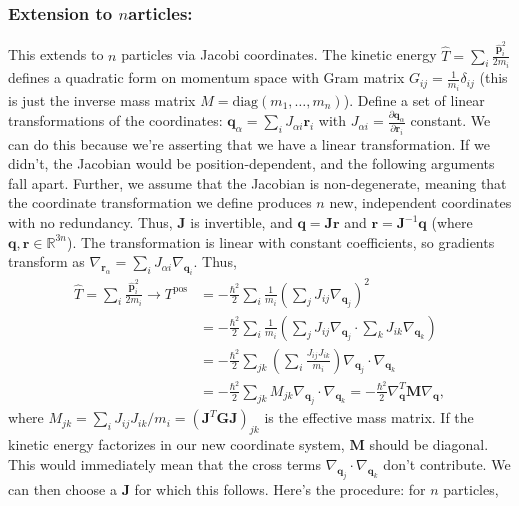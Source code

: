 \subsubsection{Extension to \texorpdfstring{$n$} particles:}
This extends to $n$ particles via Jacobi coordinates. The kinetic energy $\hat{T}=\sum_i \frac{\hat{\mathbf{p}}_i^2}{2m_i}$ defines a quadratic form on momentum space with Gram matrix $G_{ij}=\frac{1}{m_i}\delta_{ij}$ (this is just the inverse mass matrix $M=\text{diag}(m_1, \dots, m_n)$). Define a set of linear transformations of the coordinates: $\mathbf{q}_\alpha=\sum_i J_{\alpha i}\mathbf{r}_i$ with $J_{\alpha i} = \frac{\partial \mathbf{q}_\alpha}{\partial \mathbf{r}_i}$ constant. We can do this because we're asserting that we have a linear transformation. If we didn't, the Jacobian would be position-dependent, and the following arguments fall apart. Further, we assume that the Jacobian is non-degenerate, meaning that the coordinate transformation we define produces $n$ new, independent coordinates with no redundancy. Thus, $\mathbf{J}$ is invertible, and $\mathbf{q}=\mathbf{J r}$ and $\mathbf{r}=\mathbf{J}^{-1}\mathbf{q}$ (where $\mathbf{q},\mathbf{r}\in\mathbb{R}^{3n}$). The transformation is linear with constant coefficients, so gradients transform as $\nabla_{\mathbf{r}_\alpha}=\sum_i J_{\alpha i} \nabla_{\mathbf{q}_i}$. Thus,
\begin{align*}
    \hat{T}=\sum_i \frac{\hat{\mathbf{p}}_i^2}{2m_i} \rightarrow T^\text{pos}&= -\frac{\hbar^2}{2}\sum_i\frac{1}{m_i}\left(\sum_j J_{ij} \nabla_{\mathbf{q}_j}\right)^2\\
    &=-\frac{\hbar^2}{2}\sum_i \frac{1}{m_i}\left( \sum_{j} J_{ij}\nabla_{\mathbf{q}_j}\cdot\sum_k J_{ik}\nabla_{\mathbf{q}_k}\right)\\
    &= -\frac{\hbar^2}{2}\sum_{jk}\left(\sum_i \frac{J_{ij}J_{ik}}{m_i} \right)\nabla_{\mathbf{q}_j}\cdot\nabla_{\mathbf{q}_k}\\
    &= -\frac{\hbar^2}{2}\sum_{jk} M_{jk}\nabla_{\mathbf{q}_j}\cdot\nabla_{\mathbf{q}_k}= -\frac{\hbar^2}{2} \nabla_{\mathbf{q}}^T\mathbf{M}\nabla_{\mathbf{q}},
\end{align*}
where $M_{jk}=\sum_iJ_{ij}J_{ik}/m_i=(\mathbf{J}^T \mathbf{G J})_{jk}$ is the effective mass matrix. If the kinetic energy factorizes in our new coordinate system, $\mathbf{M}$ should be diagonal. This would immediately mean that the cross terms $\nabla_{\mathbf{q}_j}\cdot\nabla_{\mathbf{q}_k}$ don't contribute. We can then choose a $\mathbf{J}$ for which this follows. Here's the procedure: for $n$ particles,
